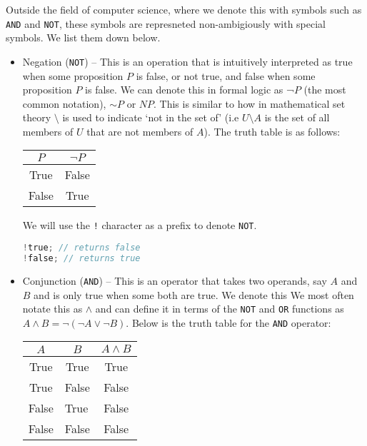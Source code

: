Outside the field of computer science, where we denote this with symbols such as \verb+AND+ and \verb+NOT+, these symbols are represneted non-ambigiously with special symbols. We list them down below. 

\begin{itemize}

\item Negation (\verb+NOT+) – This is an operation that is intuitively interpreted as true when some proposition \(P\) is false, or not true, and false when some proposition \(P\) is false. We can denote this in formal logic as ¬\(P\) (the most common notation), \(\sim P\) or \(NP\). This is similar to how in mathematical set theory \(\setminus \) is used to indicate `not in the set of' (i.e \({\displaystyle U\setminus A}\) is the set of all members of \(U\) that are not members of \(A\)). The truth table is as follows:


\begin{table}[h]
{\centering
\begin{tabular}{|c|c|}
\hline
\(P\) & \(\neg P\) \\ \hline
True       & False           \\ \hline
False      & True            \\ \hline
\end{tabular} \par }
\end{table}

We will use the \verb+!+ character as a prefix to denote \verb+NOT+. 

\begin{lstlisting}[language=C]
!true; // returns false
!false; // returns true
\end{lstlisting}

\item Conjunction (\verb+AND+) – This is an operator that takes two operands, say \(A\) and \(B\) and is only true when some both are true. We denote this We most often notate this as \(\wedge\) and can define it in terms of the \verb+NOT+ and \verb+OR+ functions as  \(A \wedge B = \neg(\neg A \lor \neg B) \). Below is the truth table for the \verb+AND+ operator:

\begin{table}[h]
{\centering
\begin{tabular}{|c|c|c|}
\hline
\(A\)                           & \(B\)                 & \(A \wedge B\) \\ \hline
True                        & True                       & True       \\ \hline
True                        & False                      & False      \\ \hline
\multicolumn{1}{|l|}{False} & \multicolumn{1}{l|}{True}  & False      \\ \hline
\multicolumn{1}{|l|}{False} & \multicolumn{1}{l|}{False} & False      \\ \hline
\end{tabular} \par }
\end{table}


\end{itemize}

